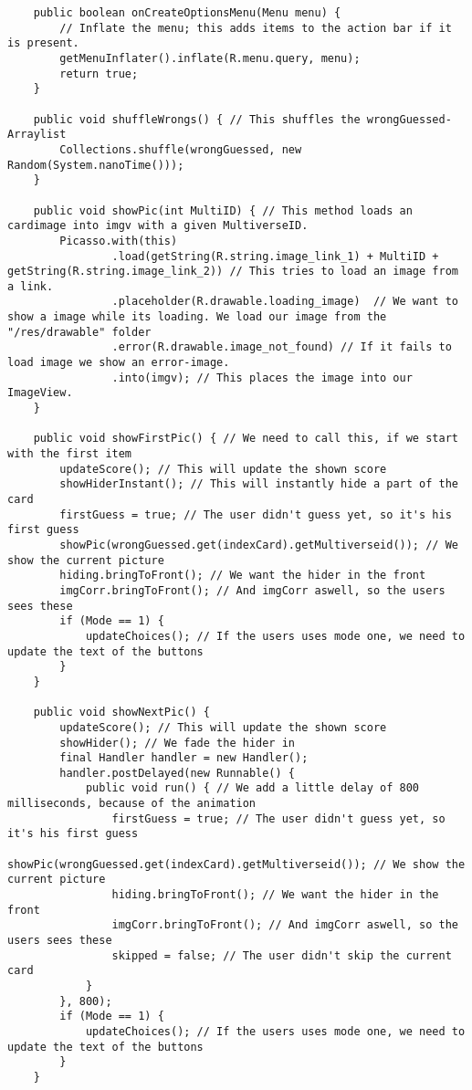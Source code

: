 \begin{lstlisting}
    public boolean onCreateOptionsMenu(Menu menu) {
        // Inflate the menu; this adds items to the action bar if it is present.
        getMenuInflater().inflate(R.menu.query, menu);
        return true;
    }

    public void shuffleWrongs() { // This shuffles the wrongGuessed-Arraylist
        Collections.shuffle(wrongGuessed, new Random(System.nanoTime()));
    }

    public void showPic(int MultiID) { // This method loads an cardimage into imgv with a given MultiverseID.
        Picasso.with(this)
                .load(getString(R.string.image_link_1) + MultiID +  getString(R.string.image_link_2)) // This tries to load an image from a link.
                .placeholder(R.drawable.loading_image)  // We want to show a image while its loading. We load our image from the "/res/drawable" folder
                .error(R.drawable.image_not_found) // If it fails to load image we show an error-image.
                .into(imgv); // This places the image into our ImageView.
    }

    public void showFirstPic() { // We need to call this, if we start with the first item
        updateScore(); // This will update the shown score
        showHiderInstant(); // This will instantly hide a part of the card
        firstGuess = true; // The user didn't guess yet, so it's his first guess
        showPic(wrongGuessed.get(indexCard).getMultiverseid()); // We show the current picture
        hiding.bringToFront(); // We want the hider in the front
        imgCorr.bringToFront(); // And imgCorr aswell, so the users sees these
        if (Mode == 1) {
            updateChoices(); // If the users uses mode one, we need to update the text of the buttons
        }
    }

    public void showNextPic() {
        updateScore(); // This will update the shown score
        showHider(); // We fade the hider in
        final Handler handler = new Handler();
        handler.postDelayed(new Runnable() {
            public void run() { // We add a little delay of 800 milliseconds, because of the animation
                firstGuess = true; // The user didn't guess yet, so it's his first guess
                showPic(wrongGuessed.get(indexCard).getMultiverseid()); // We show the current picture
                hiding.bringToFront(); // We want the hider in the front
                imgCorr.bringToFront(); // And imgCorr aswell, so the users sees these
                skipped = false; // The user didn't skip the current card
            }
        }, 800);
        if (Mode == 1) {
            updateChoices(); // If the users uses mode one, we need to update the text of the buttons
        }
    }


\end{lstlisting}
